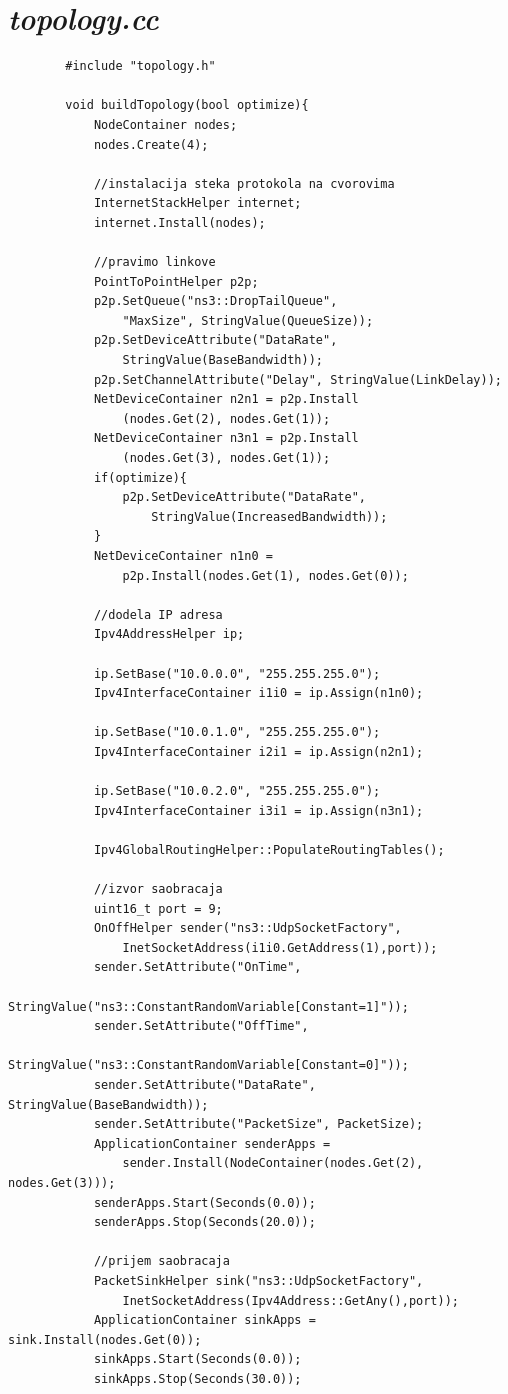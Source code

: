\documentclass[a4paper, 12pt, projekat]{etf}
\begin{document}
	\section*{\emph{topology.cc}}
	\begin{verbatim}
		#include "topology.h"
		
		void buildTopology(bool optimize){
			NodeContainer nodes;
			nodes.Create(4);
			
			//instalacija steka protokola na cvorovima
			InternetStackHelper internet;
			internet.Install(nodes);
			
			//pravimo linkove
			PointToPointHelper p2p;
			p2p.SetQueue("ns3::DropTailQueue", 
			    "MaxSize", StringValue(QueueSize));
			p2p.SetDeviceAttribute("DataRate", 
			    StringValue(BaseBandwidth));
			p2p.SetChannelAttribute("Delay", StringValue(LinkDelay));
			NetDeviceContainer n2n1 = p2p.Install
			    (nodes.Get(2), nodes.Get(1));
			NetDeviceContainer n3n1 = p2p.Install
			    (nodes.Get(3), nodes.Get(1));
			if(optimize){
				p2p.SetDeviceAttribute("DataRate",
				    StringValue(IncreasedBandwidth));
			}
			NetDeviceContainer n1n0 = 
			    p2p.Install(nodes.Get(1), nodes.Get(0));
			
			//dodela IP adresa
			Ipv4AddressHelper ip;
			
			ip.SetBase("10.0.0.0", "255.255.255.0");
			Ipv4InterfaceContainer i1i0 = ip.Assign(n1n0);
			
			ip.SetBase("10.0.1.0", "255.255.255.0");
			Ipv4InterfaceContainer i2i1 = ip.Assign(n2n1);
			
			ip.SetBase("10.0.2.0", "255.255.255.0");
			Ipv4InterfaceContainer i3i1 = ip.Assign(n3n1);
			
			Ipv4GlobalRoutingHelper::PopulateRoutingTables();
			
			//izvor saobracaja
			uint16_t port = 9;
			OnOffHelper sender("ns3::UdpSocketFactory", 
			    InetSocketAddress(i1i0.GetAddress(1),port));
			sender.SetAttribute("OnTime", 
			    StringValue("ns3::ConstantRandomVariable[Constant=1]"));
			sender.SetAttribute("OffTime", 
			    StringValue("ns3::ConstantRandomVariable[Constant=0]"));
			sender.SetAttribute("DataRate", StringValue(BaseBandwidth));
			sender.SetAttribute("PacketSize", PacketSize);
			ApplicationContainer senderApps = 
			    sender.Install(NodeContainer(nodes.Get(2), nodes.Get(3)));
			senderApps.Start(Seconds(0.0));
			senderApps.Stop(Seconds(20.0));
			
			//prijem saobracaja
			PacketSinkHelper sink("ns3::UdpSocketFactory",
			    InetSocketAddress(Ipv4Address::GetAny(),port));
			ApplicationContainer sinkApps = sink.Install(nodes.Get(0));
			sinkApps.Start(Seconds(0.0));
			sinkApps.Stop(Seconds(30.0));
			

\end{verbatim}
\end{document}
